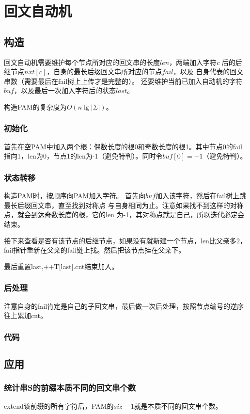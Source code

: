 \section{回文自动机}
\subsection{构造}
回文自动机需要维护每个节点所对应的回文串的长度$len$，两端加入字符$c$
后的后继节点$nxt[c]$，自身的最长后缀回文串所对应的节点$fail$，以及
自身代表的回文串数（需要最后在fail树上上传才是完整的）。
还要维护当前已加入自动机的字符$buf$，以及最后一次加入字符后的状态$last$。

构造PAM的复杂度为$O(n\lg |\Sigma|)$。
\subsubsection{初始化}
首先在空PAM中加入两个根：偶数长度的根0和奇数长度的根1。其中节点0的fail
指向1，len为0，节点1的len为-1（避免特判）。同时令$buf[0]=-1$（避免特判）。
\subsubsection{状态转移}
构造PAM时，按顺序向PAM加入字符。
首先向$buf$加入该字符，然后在fail树上跳最长后缀回文串，直至找到对称点
与自身相同为止。注意如果找不到这样的对称点，就会到达奇数长度的根，它的len
为-1，其对称点就是自己，所以迭代必定会结束。

接下来查看是否有该节点的后继节点，如果没有就新建一个节点，len比父亲多2，
fail指针重新在父亲的fail链上找。然后把该节点挂在父亲下。

最后重置last,++T[last].cnt结束加入。
\subsubsection{后处理}
注意自身的fail肯定是自己的子回文串，最后做一次后处理，按照节点编号的逆序
往上累加cnt。
\subsubsection{代码}

\subsection{应用}
\subsubsection{统计串S的前缀本质不同的回文串个数}
extend该前缀的所有字符后，PAM的$siz-1$就是本质不同的回文串个数。
